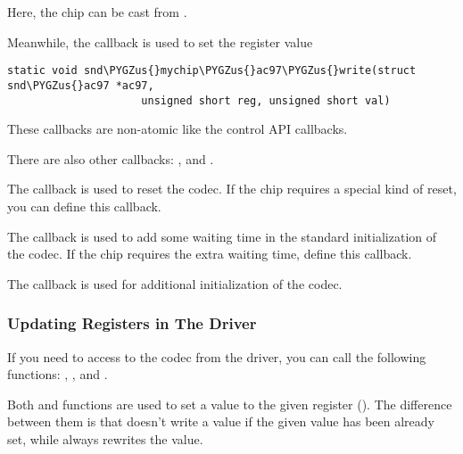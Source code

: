 \documentclass[a4paper,8pt,english]{sphinxmanual}
\def\PYGZus{\char`\_}
\begin{document}
Here, the chip can be cast from .

Meanwhile, the  callback is used to set the register
value

\begin{Verbatim}[commandchars=\\\{\}]
static void snd\PYGZus{}mychip\PYGZus{}ac97\PYGZus{}write(struct snd\PYGZus{}ac97 *ac97,
                     unsigned short reg, unsigned short val)
\end{Verbatim}

These callbacks are non-atomic like the control API callbacks.

There are also other callbacks: ,  and .

The  callback is used to reset the codec. If the chip
requires a special kind of reset, you can define this callback.

The  callback is used to add some waiting time in the standard
initialization of the codec. If the chip requires the extra waiting
time, define this callback.

The  callback is used for additional initialization of the
codec.


\subsubsection{Updating Registers in The Driver}
\label{sound/kernel-api/writing-an-alsa-driver:updating-registers-in-the-driver}
If you need to access to the codec from the driver, you can call the
following functions: {\hyperref[sound/kernel\string-api/alsa\string-driver\string-api:c.snd_ac97_write]{\emph{}}},
{\hyperref[sound/kernel\string-api/alsa\string-driver\string-api:c.snd_ac97_read]{\emph{}}}, {\hyperref[sound/kernel\string-api/alsa\string-driver\string-api:c.snd_ac97_update]{\emph{}}} and
{\hyperref[sound/kernel\string-api/alsa\string-driver\string-api:c.snd_ac97_update_bits]{\emph{}}}.

Both {\hyperref[sound/kernel\string-api/alsa\string-driver\string-api:c.snd_ac97_write]{\emph{}}} and
{\hyperref[sound/kernel\string-api/alsa\string-driver\string-api:c.snd_ac97_update]{\emph{}}} functions are used to set a value to
the given register (). The difference between them is that
{\hyperref[sound/kernel\string-api/alsa\string-driver\string-api:c.snd_ac97_update]{\emph{}}} doesn't write a value if the given
value has been already set, while {\hyperref[sound/kernel\string-api/alsa\string-driver\string-api:c.snd_ac97_write]{\emph{}}}
always rewrites the value.
\end{document}

